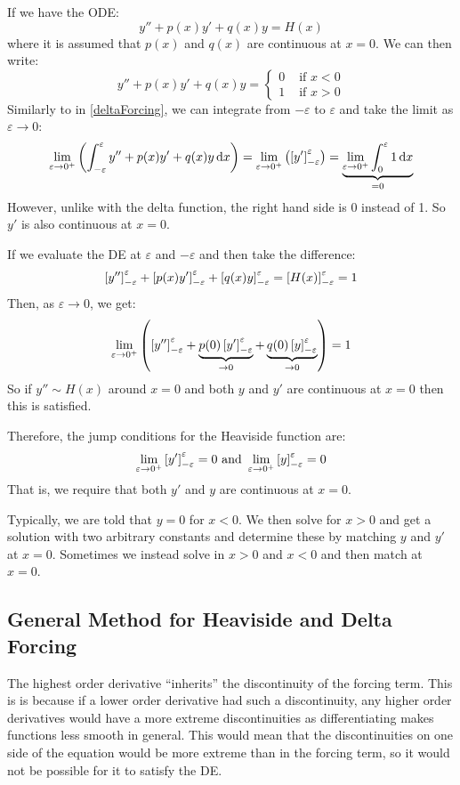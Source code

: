 \documentclass[../main.tex]{subfiles}
\begin{document}
If we have the ODE:
\[
  y'' + p(x)y' + q(x)y = H(x)
\]
where it is assumed that $p(x)$ and $q(x)$ are continuous at $x = 0$.
We can then write:
\[
  y'' + p(x)y' + q(x)y = \begin{cases}
  0 & \text{ if }x < 0 \\
  1 & \text{ if }x > 0
  \end{cases}
\]
Similarly to in \cref{deltaForcing}, we can integrate from $-\varepsilon$ to $\varepsilon$ and take the limit as $\varepsilon \to 0$:
\[
  \lim_{\varepsilon \to 0^{+}} \left(\int_{-\varepsilon}^{\varepsilon} y'' + p(x)y' + q(x)y \d{x}\right) = \lim_{\varepsilon \to 0^{+}} \left(\eval{y'}{-\varepsilon}{\varepsilon}\right) = \underbrace{\lim_{\varepsilon \to 0^{+}} \int_{0}^{\varepsilon} 1 \d{x}}_{= 0}
\]
However, unlike with the delta function, the right hand side is 0 instead of 1.
So $y'$ is also continuous at $x = 0$.

If we evaluate the DE at $\varepsilon$ and $-\varepsilon$ and then take the difference:
\[
  \left[y''\right]_{-\varepsilon}^{\varepsilon} + \left[p(x)y'\right]_{-\varepsilon}^{\varepsilon} + \left[q(x)y\right]_{-\varepsilon}^{\varepsilon} = \left[H(x)\right]_{-\varepsilon}^{\varepsilon} = 1
\]
Then, as $\varepsilon \to 0$, we get:
\[
  \lim_{\varepsilon \to 0^{+}} \left(\left[y''\right]_{-\varepsilon}^{\varepsilon} + \underbrace{p(0)\left[y'\right]_{-\varepsilon}^{\varepsilon}}_{\to 0} + \underbrace{q(0)\left[y\right]_{-\varepsilon}^{\varepsilon}}_{\to 0}\right) = 1
\]
So if $y'' \sim H(x)$ around $x = 0$ and both $y$ and $y'$ are continuous at $x = 0$ then this is satisfied.

Therefore, the jump conditions for the Heaviside function are:
\[
  \lim_{\varepsilon \to 0^{+}} \left[y'\right]_{-\varepsilon}^{\varepsilon} = 0 \text{ and }
  \lim_{\varepsilon \to 0^{+}} \left[y\right]_{-\varepsilon}^{\varepsilon} = 0
\]
That is, we require that both $y'$ and $y$ are continuous at $x = 0$.

Typically, we are told that $y = 0$ for $x < 0$.
We then solve for $x > 0$ and get a solution with two arbitrary constants and determine these by matching $y$ and $y'$ at $x = 0$.
Sometimes we instead solve in $x > 0$ and $x < 0$ and then match at $x = 0$.
\subsection{General Method for Heaviside and Delta Forcing}
The highest order derivative ``inherits'' the discontinuity of the forcing term.
This is is because if a lower order derivative had such a discontinuity, any higher order derivatives would have a more extreme discontinuities as differentiating makes functions less smooth in general.
This would mean that the discontinuities on one side of the equation would be more extreme than in the forcing term, so it would not be possible for it to satisfy the DE.
\end{document}
